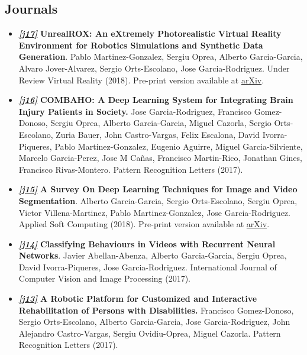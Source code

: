 \documentclass[8pt]{article}
\begin{document}
\subsection*{Journals}

\begin{itemize}
    \item \emph{\textbf{\href{https://arxiv.org/abs/1810.06936}{[j17]}}} \textbf{UnrealROX: An eXtremely Photorealistic Virtual Reality Environment for Robotics Simulations and Synthetic Data Generation}. Pablo Martinez-Gonzalez, Sergiu Oprea, Alberto Garcia-Garcia, Alvaro Jover-Alvarez, Sergio Orts-Escolano, Jose Garcia-Rodriguez. Under Review Virtual Reality (2018). Pre-print version available at {\href{https://arxiv.org/abs/1810.06936}{arXiv}}.
    \item \emph{\textbf{\href{https://www.sciencedirect.com/science/article/pii/S0167865519300534}{[j16]}}} \textbf{COMBAHO: A Deep Learning System for Integrating Brain Injury Patients in Society.} Jose Garcia-Rodriguez, Francisco Gomez-Donoso, Sergiu Oprea, Alberto Garcia-Garcia, Miguel Cazorla, Sergio Orts-Escolano, Zuria Bauer, John Castro-Vargas, Felix Escalona, David Ivorra-Piqueres, Pablo Martinez-Gonzalez, Eugenio Aguirre, Miguel Garcia-Silviente, Marcelo Garcia-Perez, Jose M Cañas, Francisco Martin-Rico, Jonathan Gines, Francisco Rivas-Montero. Pattern Recognition Letters (2017).
    \item \emph{\textbf{\href{https://www.sciencedirect.com/science/article/pii/S1568494618302813}{[j15]}}} \textbf{A Survey On Deep Learning Techniques for Image and Video Segmentation}. Alberto Garcia-Garcia, Sergio Orts-Escolano, Sergiu Oprea, Victor Villena-Martinez, Pablo Martinez-Gonzalez, Jose Garcia-Rodriguez. Applied Soft Computing (2018). Pre-print version available at {\href{https://arxiv.org/abs/1704.06857}{arXiv}}.
    \item \emph{\textbf{\href{https://www.igi-global.com/article/classifying-behaviours-in-videos-with-recurrent-neural-networks/195006}{[j14]}}} \textbf{Classifying Behaviours in Videos with Recurrent Neural Networks}. Javier Abellan-Abenza, Alberto Garcia-Garcia, Sergiu Oprea, David Ivorra-Piqueres, Jose Garcia-Rodriguez. International Journal of Computer Vision and Image Processing (2017).
    \item \emph{\textbf{\href{http://www.sciencedirect.com/science/article/pii/S0167865517301903}{[j13]}}} \textbf{A Robotic Platform for Customized and Interactive Rehabilitation of Persons with Disabilities.} Francisco Gomez-Donoso, Sergio Orts-Escolano, Alberto Garcia-Garcia, Jose Garcia-Rodriguez, John Alejandro Castro-Vargas, Sergiu Ovidiu-Oprea, Miguel Cazorla. Pattern Recognition Letters (2017).

\end{itemize}
\end{document}
